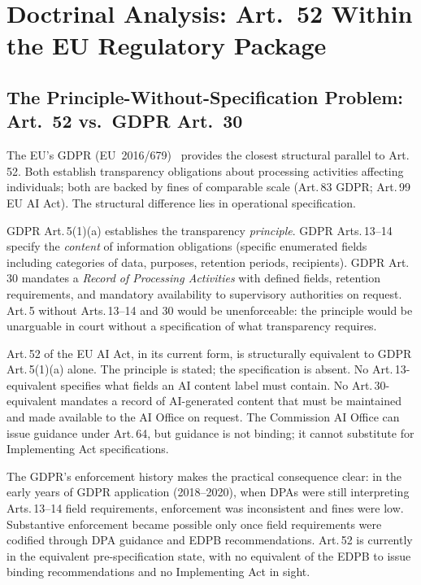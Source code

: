 \documentclass[conference]{IEEEtran}
\begin{document}
\section{Doctrinal Analysis: Art.~52 Within the EU Regulatory Package}
\label{sec:doctrinal}

\subsection{The Principle-Without-Specification Problem: Art.~52
vs.\ GDPR Art.~30}

The EU's GDPR (EU~2016/679)~\cite{gdpr2016} provides the closest
structural parallel to Art.\,52.  Both establish transparency obligations
about processing activities affecting individuals; both are backed by
fines of comparable scale (Art.\,83 GDPR; Art.\,99 EU AI Act).  The
structural difference lies in operational specification.

GDPR Art.\,5(1)(a) establishes the transparency \emph{principle}.
GDPR Arts.\,13--14 specify the \emph{content} of information obligations
(specific enumerated fields including categories of data, purposes,
retention periods, recipients).  GDPR Art.\,30 mandates a \emph{Record
of Processing Activities} with defined fields, retention requirements,
and mandatory availability to supervisory authorities on request.
Art.\,5 without Arts.\,13--14 and 30 would be unenforceable: the
principle would be unarguable in court without a specification of what
transparency requires.

Art.\,52 of the EU AI Act, in its current form, is structurally
equivalent to GDPR Art.\,5(1)(a) alone.  The principle is stated; the
specification is absent.  No Art.\,13-equivalent specifies what fields
an AI content label must contain.  No Art.\,30-equivalent mandates a
record of AI-generated content that must be maintained and made available
to the AI Office on request.  The Commission AI Office can issue guidance
under Art.\,64, but guidance is not binding; it cannot substitute for
Implementing Act specifications.

The GDPR's enforcement history makes the practical consequence clear:
in the early years of GDPR application (2018--2020), when DPAs were
still interpreting Arts.\,13--14 field requirements, enforcement was
inconsistent and fines were low.  Substantive enforcement became possible
only once field requirements were codified through DPA guidance and EDPB
recommendations.  Art.\,52 is currently in the equivalent
pre-specification state, with no equivalent of the EDPB to issue binding
recommendations and no Implementing Act in sight.
\end{document}
